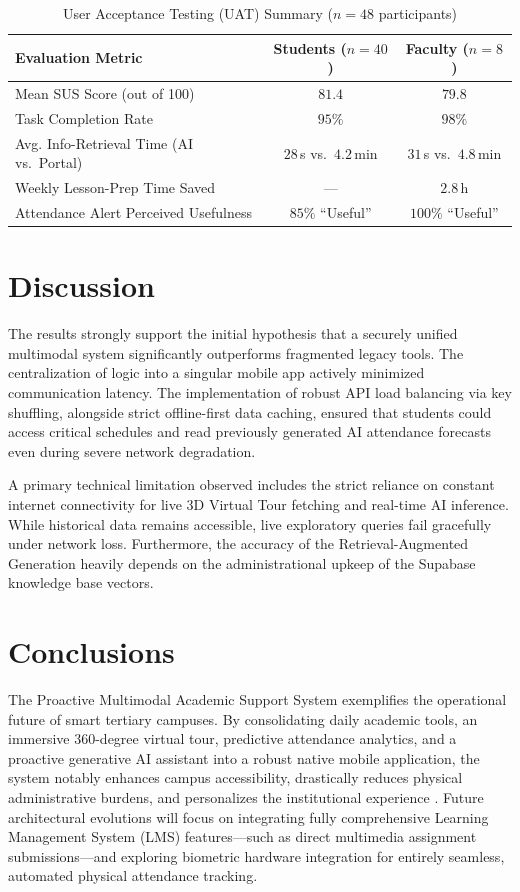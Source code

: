 \documentclass[]{einformatica}
\begin{document}
\begin{table}[htbp]
\centering
\caption{User Acceptance Testing (UAT) Summary ($n = 48$ participants)}
\label{tab:uat}
\begin{tabular}{@{}lcc@{}}
\toprule
\textbf{Evaluation Metric} & \textbf{Students ($n=40$)} & \textbf{Faculty ($n=8$)} \\ \midrule
Mean SUS Score (out of 100) & $81.4$ & $79.8$ \\
Task Completion Rate & $95\%$ & $98\%$ \\
Avg. Info-Retrieval Time (AI vs.\ Portal) & $28$\,s vs.\ $4.2$\,min & $31$\,s vs.\ $4.8$\,min \\
Weekly Lesson-Prep Time Saved & --- & $2.8$\,h \\
Attendance Alert Perceived Usefulness & $85\%$ ``Useful'' & $100\%$ ``Useful'' \\ \bottomrule
\end{tabular}
\end{table}

\section{Discussion}\label{sec:Discussion}

The results strongly support the initial hypothesis that a securely unified multimodal system significantly outperforms fragmented legacy tools. The centralization of logic into a singular mobile app actively minimized communication latency. The implementation of robust API load balancing via key shuffling, alongside strict offline-first data caching, ensured that students could access critical schedules and read previously generated AI attendance forecasts even during severe network degradation.

A primary technical limitation observed includes the strict reliance on constant internet connectivity for live 3D Virtual Tour fetching and real-time AI inference. While historical data remains accessible, live exploratory queries fail gracefully under network loss. Furthermore, the accuracy of the Retrieval-Augmented Generation heavily depends on the administrational upkeep of the Supabase knowledge base vectors.


\section{Conclusions}\label{sec:Conclusions}

The Proactive Multimodal Academic Support System exemplifies the operational future of smart tertiary campuses. By consolidating daily academic tools, an immersive 360-degree virtual tour, predictive attendance analytics, and a proactive generative AI assistant into a robust native mobile application, the system notably enhances campus accessibility, drastically reduces physical administrative burdens, and personalizes the institutional experience \cite{madaio2024}. Future architectural evolutions will focus on integrating fully comprehensive Learning Management System (LMS) features—such as direct multimedia assignment submissions—and exploring biometric hardware integration for entirely seamless, automated physical attendance tracking.
\end{document}

